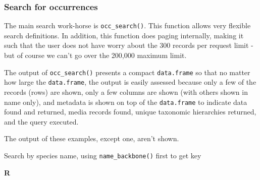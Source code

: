 \documentclass[3p]{elsarticle} %
\newenvironment{Shaded}{\begin{snugshade}}{\end{snugshade}}
\newcommand{\CommentTok}[1]{\textcolor[rgb]{0.56,0.35,0.01}{\textit{#1}}}
\newcommand{\DataTypeTok}[1]{\textcolor[rgb]{0.13,0.29,0.53}{#1}}
\newcommand{\DecValTok}[1]{\textcolor[rgb]{0.00,0.00,0.81}{#1}}
\newcommand{\KeywordTok}[1]{\textcolor[rgb]{0.13,0.29,0.53}{\textbf{#1}}}
\newcommand{\NormalTok}[1]{#1}
\newcommand{\OperatorTok}[1]{\textcolor[rgb]{0.81,0.36,0.00}{\textbf{#1}}}
\newcommand{\StringTok}[1]{\textcolor[rgb]{0.31,0.60,0.02}{#1}}
\begin{document}
\hypertarget{search-for-occurrences}{%
\subsubsection{Search for occurrences}\label{search-for-occurrences}}

The main search work-horse is \texttt{occ\_search()}. This function
allows very flexible search definitions. In addition, this function does
paging internally, making it such that the user does not have worry
about the 300 records per request limit - but of course we can't go over
the 200,000 maximum limit.

The output of \texttt{occ\_search()} presents a compact
\texttt{data.frame} so that no matter how large the \texttt{data.frame},
the output is easily assessed because only a few of the records (rows)
are shown, only a few columns are shown (with others shown in name
only), and metadata is shown on top of the \texttt{data.frame} to
indicate data found and returned, media records found, unique taxonomic
hierarchies returned, and the query executed.

The output of these examples, except one, aren't shown.

Search by species name, using \texttt{name\_backbone()} first to get key

\textbf{R}

\begin{Shaded}
\end{Shaded}
\end{document}

